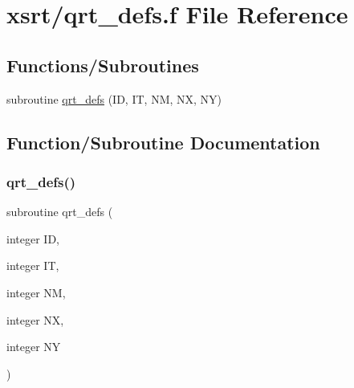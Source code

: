 \hypertarget{qrt__defs_8f}{}\section{xsrt/qrt\+\_\+defs.f File Reference}
\label{qrt__defs_8f}
\subsection*{Functions/\+Subroutines}
\begin{DoxyCompactItemize}
\item 
subroutine \hyperlink{qrt__defs_8f_acf1cae9f085dc8547c6553622e5f74cd}{qrt\+\_\+defs} (ID, IT, NM, NX, NY)
\end{DoxyCompactItemize}


\subsection{Function/\+Subroutine Documentation}
\mbox{\label{qrt__defs_8f_acf1cae9f085dc8547c6553622e5f74cd}} 
\subsubsection{\texorpdfstring{qrt\+\_\+defs()}{qrt\_defs()}}
{\footnotesize\ttfamily subroutine qrt\+\_\+defs (\begin{DoxyParamCaption}\item[{integer}]{ID,  }\item[{integer}]{IT,  }\item[{integer}]{NM,  }\item[{integer}]{NX,  }\item[{integer}]{NY }\end{DoxyParamCaption})}

